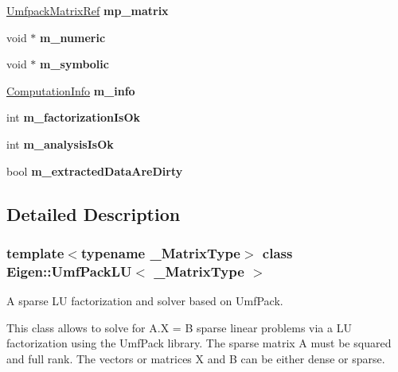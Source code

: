 \begin{DoxyCompactItemize}
\mbox{\hyperlink{class_eigen_1_1_ref}{Umfpack\+Matrix\+Ref}} {\bfseries mp\+\_\+matrix}
\item 
\mbox{\label{class_eigen_1_1_umf_pack_l_u_a1e9ee531f2c0fc41781ca1cfb9de7c45}} 
void $\ast$ {\bfseries m\+\_\+numeric}
\item 
\mbox{\label{class_eigen_1_1_umf_pack_l_u_a2d8f1ae8b324facd05f2c4a67fb36bd9}} 
void $\ast$ {\bfseries m\+\_\+symbolic}
\item 
\mbox{\label{class_eigen_1_1_umf_pack_l_u_abe14c88bdd4a2a8eb3acac209d57f78e}} 
\mbox{\hyperlink{group__enums_ga85fad7b87587764e5cf6b513a9e0ee5e}{Computation\+Info}} {\bfseries m\+\_\+info}
\item 
\mbox{\label{class_eigen_1_1_umf_pack_l_u_a2035de2dc3b834ffc761c8e689b2d6fb}} 
int {\bfseries m\+\_\+factorization\+Is\+Ok}
\item 
\mbox{\label{class_eigen_1_1_umf_pack_l_u_a709615cdd6a89ceb8bf072922adbc621}} 
int {\bfseries m\+\_\+analysis\+Is\+Ok}
\item 
\mbox{\label{class_eigen_1_1_umf_pack_l_u_a9611324e2e3f3ab0e643c91651661750}} 
bool {\bfseries m\+\_\+extracted\+Data\+Are\+Dirty}
\end{DoxyCompactItemize}


\subsection{Detailed Description}
\subsubsection*{template$<$typename \+\_\+\+Matrix\+Type$>$\newline
class Eigen\+::\+Umf\+Pack\+L\+U$<$ \+\_\+\+Matrix\+Type $>$}

A sparse LU factorization and solver based on Umf\+Pack. 

This class allows to solve for A.\+X = B sparse linear problems via a LU factorization using the Umf\+Pack library. The sparse matrix A must be squared and full rank. The vectors or matrices X and B can be either dense or sparse.


